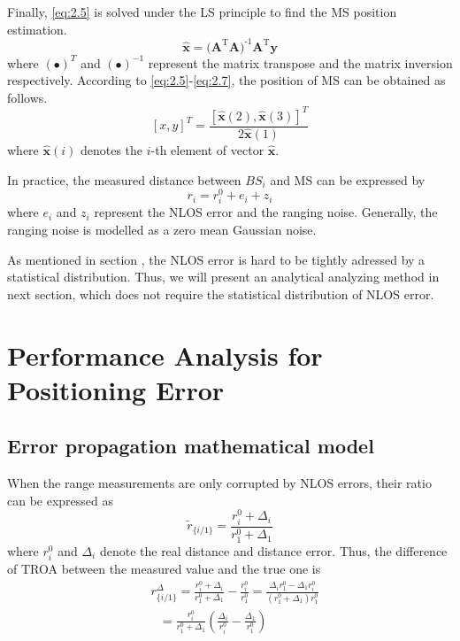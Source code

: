 \documentclass[journal]{IEEEtran}
\begin{document}
Finally, \eqref{eq:2.5} is solved under the LS principle to find the MS position estimation.
\begin{equation}\label{eq:2.7}
\mathbf{\hat{x}=(}{{\mathbf{A}}^{\text{T}}}\mathbf{A}{{\mathbf{)}}^{\text{-1}}}{{\mathbf{A}}^{\text{T}}}\mathbf{y}
\end{equation}
where ${{{(\bullet )}^{T}}}$ and ${{{(\bullet )}^{-1}}}$ represent the matrix transpose and the matrix inversion respectively. According to \eqref{eq:2.5}-\eqref{eq:2.7}, the position of MS can be obtained as follows.
\begin{equation}\label{eq:2.8}
{{[x,y]}^{T}}=\frac{{{[\mathbf{\hat{x}}(2),\mathbf{\hat{x}}(3)]}^{T}}}{2\mathbf{\hat{x}}(1)}
\end{equation}
where ${\mathbf{\hat{x}}(i)}$ denotes the ${i}$-th element of vector ${\mathbf{\hat{x}}}$.

In practice, the measured distance between ${BS}_{i}$ and MS can be expressed by
\begin{equation}\label{eq:2.9}
    {r_i} = r_i^0 + {e_i} + {z_i}
     \end{equation}
where ${e_i}$ and ${z_i}$ represent the NLOS error and the ranging noise. Generally, the ranging noise is modelled as a zero mean Gaussian noise.

As mentioned in section \uppercase\expandafter{}, the NLOS error is hard to be tightly adressed by a statistical distribution. Thus, we will present an analytical analyzing method in next section, which does not require the statistical distribution of NLOS error.

\section{Performance Analysis for Positioning Error}
\subsection{Error propagation mathematical model}

When the range measurements are only corrupted by NLOS errors, their ratio can be expressed as
\begin{equation}\label{eq:2.10}
\widetilde{{r}}_{\{i/1\}}=\frac{r_{i}^{0}+\Delta{_{i}}}{r_{1}^{0}+\Delta {_{1}}}
\end{equation}
where $r_{i}^{0}$ and $\Delta{_{i}}$ denote the real distance and distance error. Thus, the difference of TROA between the measured value and the true one is
\begin{equation}\label{eq:2.11}
\begin{aligned}
  &  {{r}_{\{i/1\}}^{\Delta}}=\frac{r_{i}^{0}+\Delta{_{i}}}{r_{1}^{0}+\Delta{_{1}}}-\frac{r_{i}^{0}}{r_{1}^{0}}=\frac{\Delta{_{i}}r_{1}^{0}-\Delta {_{1}}r_{i}^{0}}{({r_{1}^{0}}+\Delta{_{1}})r_{1}^{0}} \\
 & \text{       }=\frac{r_{i}^{0}}{r_{1}^{0}+\Delta {_{1}}}\left(\frac{\Delta {_{i}}}{r_{i}^{0}}-\frac{\Delta {_{1}}}{r_{1}^{0}}\right) \\
\end{aligned}
\end{equation}
\end{document}
